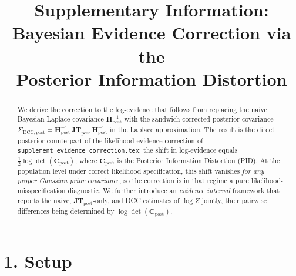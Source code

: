 \documentclass[11pt]{article}
\title{Supplementary Information:\\
Bayesian Evidence Correction via the\\
Posterior Information Distortion}
\author{}
\date{}
\begin{document}
\maketitle

\begin{abstract}
\noindent We derive the correction to the log-evidence that follows from
replacing the naive Bayesian Laplace covariance $\mathbf H_{\mathrm{post}}^{-1}$
with the sandwich-corrected posterior covariance
$\Sigma_{\mathrm{DCC},\mathrm{post}} = \mathbf H_{\mathrm{post}}^{-1}\,
\mathbf{JT}_{\mathrm{post}}\,\mathbf H_{\mathrm{post}}^{-1}$ in the Laplace
approximation. The result is the direct posterior counterpart of the likelihood
evidence correction of \texttt{supplement\_evidence\_correction.tex}: the shift
in log-evidence equals $\tfrac{1}{2}\log\det(\mathbf C_{\mathrm{post}})$, where
$\mathbf C_{\mathrm{post}}$ is the Posterior Information Distortion (PID). At
the population level under correct likelihood specification, this shift vanishes
\emph{for any proper Gaussian prior covariance}, so the correction is in that
regime a pure likelihood-misspecification diagnostic. We further introduce an
\emph{evidence interval} framework that reports the naive,
$\mathbf{JT}_{\mathrm{post}}$-only, and DCC estimates of $\log Z$ jointly, their
pairwise differences being determined by $\log\det(\mathbf C_{\mathrm{post}})$.
\end{abstract}

\section*{1. Setup}
\end{document}
